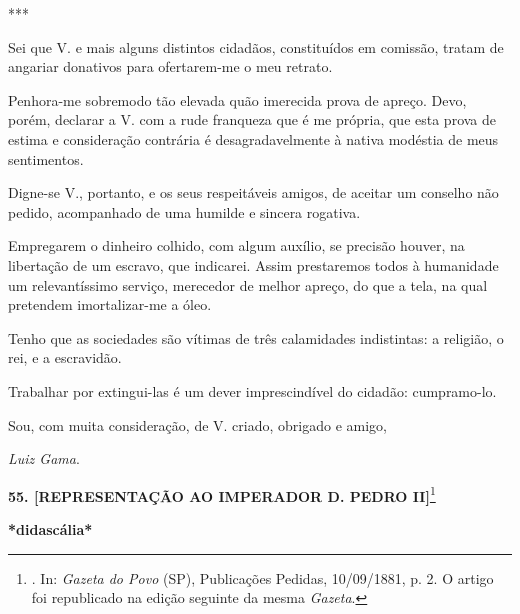 ***

Sei que V. e mais alguns distintos cidadãos, constituídos em comissão,
tratam de angariar donativos para ofertarem-me o meu retrato.

Penhora-me sobremodo tão elevada quão imerecida prova de apreço. Devo,
porém, declarar a V. com a rude franqueza que é me própria, que esta
prova de estima e consideração contrária é desagradavelmente à nativa
modéstia de meus sentimentos.

Digne-se V., portanto, e os seus respeitáveis amigos, de aceitar um
conselho não pedido, acompanhado de uma humilde e sincera rogativa.

Empregarem o dinheiro colhido, com algum auxílio, se precisão houver, na
libertação de um escravo, que indicarei. Assim prestaremos todos à
humanidade um relevantíssimo serviço, merecedor de melhor apreço, do que
a tela, na qual pretendem imortalizar-me a óleo.

Tenho que as sociedades são vítimas de três calamidades indistintas: a
religião, o rei, e a escravidão.

Trabalhar por extingui-las é um dever imprescindível do cidadão:
cumpramo-lo.

Sou, com muita consideração, de V. criado, obrigado e amigo,

\emph{Luiz Gama}.

\textbf{55.
{[}REPRESENTAÇÃO AO IMPERADOR D. PEDRO II{]}}\footnote{. In:
  \emph{Gazeta do Povo} (SP), Publicações Pedidas, 10/09/1881, p. 2. O
  artigo foi republicado na edição seguinte da mesma \emph{Gazeta}.}

\textbf{*didascália*}

